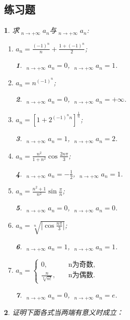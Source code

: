 \documentclass[utf8]{book}
\newtheorem{example}{}[section]             %
\newtheorem{solution}{}
\DeclareMathOperator*\lowlim{\underline{lim}}
\DeclareMathOperator*\uplim{\overline{lim}}
\begin{document}
\subsection{练习题}
\begin{example}求$\displaystyle\lowlim_{n\to +\infty}a_n$与$\displaystyle\uplim_{n\to +\infty}a_n$:
\renewcommand\labelenumi{\normalfont(\theenumi)}
\begin{enumerate}
\item $a_n = \displaystyle\frac{(-1)^n}{n}+\displaystyle\frac{1+(-1)^n}{2}$;
\begin{solution}
$\displaystyle\lowlim_{n\to +\infty}a_n = 0$, $\displaystyle\uplim_{n\to +\infty}a_n = 1$.
\end{solution}
\item $a_n = n^{(-1)^n}$;
\begin{solution}
$\displaystyle\lowlim_{n\to +\infty}a_n = 0$, $\displaystyle\uplim_{n\to +\infty}a_n = +\infty$.
\end{solution}
\item $a_n = [1+2^{(-1)^nn}]^{\frac{1}{n}}$;
\begin{solution}
$\displaystyle\lowlim_{n\to +\infty}a_n = 1$, $\displaystyle\uplim_{n\to +\infty}a_n = 2$.
\end{solution}
\item $a_n = \frac{n^2}{1+n^2}\cos{\frac{2n\pi}{3}}$;
\begin{solution}
$\displaystyle\lowlim_{n\to +\infty}a_n = -\frac{1}{2}$, $\displaystyle\uplim_{n\to +\infty}a_n = 1$.
\end{solution}
\item $a_n = \frac{n^2+1}{n^2}\sin\frac{\pi}{n}$;
\begin{solution}
$\displaystyle\lowlim_{n\to +\infty}a_n = 0$, $\displaystyle\uplim_{n\to +\infty}a_n = 0$.
\end{solution}
\item $a_n=\displaystyle\sqrt[n]{\left|\cos\frac{n\pi}{3}\right|}$;
\begin{solution}
$\displaystyle\lowlim_{n\to +\infty}a_n = 1$, $\displaystyle\uplim_{n\to +\infty}a_n = 1$.
\end{solution}
\item $a_n = 
\begin{cases}
0, \quad &\text{n为奇数},\\
\frac{n}{\sqrt[n]{n!}},\quad &\text{n为偶数}.
\end{cases}$
\begin{solution}
$\displaystyle\lowlim_{n\to +\infty}a_n = 0$, $\displaystyle\uplim_{n\to +\infty}a_n = e$.
\end{solution}
\end{enumerate}
\end{example}
\begin{example}
证明下面各式当两端有意义时成立：

\end{example}
\end{document}
